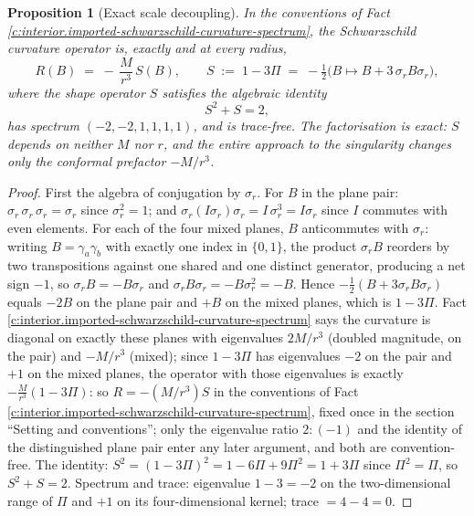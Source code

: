 \documentclass[11pt]{article}
\newtheorem{proposition}[theorem]{Proposition}
\theoremstyle{definition}
\theoremstyle{plain}
\begin{document}
\begin{proposition}[Exact scale decoupling]\label{c:interior.exact-scale-decoupling}
In the conventions of Fact \ref{c:interior.imported-schwarzschild-curvature-spectrum}, the Schwarzschild curvature operator is, exactly and at every radius,
\[
R(B) \;=\; -\,\frac{M}{r^3}\,S(B), \qquad
S \;:=\; 1 - 3\Pi \;=\; -\tfrac12\bigl(B \mapsto B + 3\,\sigma_r B \sigma_r\bigr),
\]
where the shape operator $S$ satisfies the algebraic identity
\[
S^2 + S = 2 ,
\]
has spectrum $(-2, -2, 1, 1, 1, 1)$, and is trace-free. The factorisation is exact: $S$ depends on neither $M$ nor $r$, and the entire approach to the singularity changes only the conformal prefactor $-M/r^3$.
\end{proposition}
\begin{proof}
First the algebra of conjugation by $\sigma_r$. For $B$ in the plane pair: $\sigma_r\,\sigma_r\,\sigma_r = \sigma_r$ since $\sigma_r^2 = 1$; and $\sigma_r (I\sigma_r)\sigma_r = I\,\sigma_r^3 = I\sigma_r$ since $I$ commutes with even elements. For each of the four mixed planes, $B$ anticommutes with $\sigma_r$: writing $B = \gamma_a\gamma_b$ with exactly one index in $\{0,1\}$, the product $\sigma_r B$ reorders by two transpositions against one shared and one distinct generator, producing a net sign $-1$, so $\sigma_r B = -B\sigma_r$ and $\sigma_r B \sigma_r = -B\sigma_r^2 = -B$. Hence $-\tfrac12(B + 3\sigma_r B\sigma_r)$ equals $-2B$ on the plane pair and $+B$ on the mixed planes, which is $1 - 3\Pi$. Fact \ref{c:interior.imported-schwarzschild-curvature-spectrum} says the curvature is diagonal on exactly these planes with eigenvalues $2M/r^3$ (doubled magnitude, on the pair) and $-M/r^3$ (mixed); since $1 - 3\Pi$ has eigenvalues $-2$ on the pair and $+1$ on the mixed planes, the operator with those eigenvalues is exactly $-\tfrac{M}{r^3}(1 - 3\Pi)$: so $R = -(M/r^3)S$ in the conventions of Fact \ref{c:interior.imported-schwarzschild-curvature-spectrum}, fixed once in the section ``Setting and conventions''; only the eigenvalue ratio $2 : (-1)$ and the identity of the distinguished plane pair enter any later argument, and both are convention-free. The identity: $S^2 = (1 - 3\Pi)^2 = 1 - 6\Pi + 9\Pi^2 = 1 + 3\Pi$ since $\Pi^2 = \Pi$, so $S^2 + S = 2$. Spectrum and trace: eigenvalue $1 - 3 = -2$ on the two-dimensional range of $\Pi$ and $+1$ on its four-dimensional kernel; trace $= 4 - 4 = 0$.

\end{proof}
\end{document}
